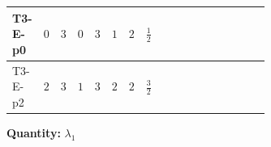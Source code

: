 \documentclass[8pt]{article}
\begin{document}
\begin{landscape}
\begin{longtable}{@{}llcccccc >{\raggedright\arraybackslash}p{0.21\linewidth} >{\raggedright\arraybackslash}p{0.21\linewidth} >{\raggedright\arraybackslash}p{0.21\linewidth}@{}}
\midrule
T3-E-p0 & $0$ & $3$ & $0$ & $3$ & $1$ & $2$ & $\frac{1}{2}$ & \scriptsize\adjustbox{max width=\linewidth}{$\begin{gathered} +12 {\lambda_1}^2\end{gathered}$} & \scriptsize\adjustbox{max width=\linewidth}{$\begin{gathered} +6 {\lambda_{HS_1}^{(1)}}^2\end{gathered}$} & \scriptsize\adjustbox{max width=\linewidth}{$\begin{gathered} +6 {\lambda_{HS_2}^{(1)}}^2\end{gathered}$} \\
\midrule
T3-E-p2 & $2$ & $3$ & $1$ & $3$ & $2$ & $2$ & $\frac{3}{2}$ & \scriptsize\adjustbox{max width=\linewidth}{$\begin{gathered} +12 {\lambda_1}^2\end{gathered}$} & \scriptsize\adjustbox{max width=\linewidth}{$\begin{gathered} +6 {\lambda_{HS_1}^{(1)}}^2\end{gathered}$} & \scriptsize\adjustbox{max width=\linewidth}{$\begin{gathered} +6 {\lambda_{HS_2}^{(1)}}^2\end{gathered}$} \\
\midrule
\bottomrule
\end{longtable}
\clearpage
\noindent\textbf{Quantity: }$\lambda_1$\par\smallskip

\end{landscape}
\end{document}
